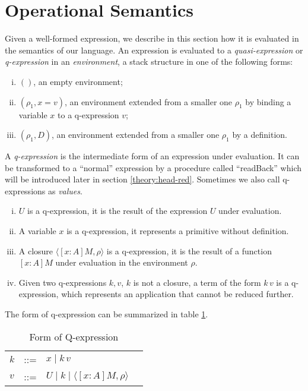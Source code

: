 \section{Operational Semantics}\label{theory:semantic}
Given a well-formed expression, we describe in this section how it is evaluated in the semantics of our language. An expression is evaluated to a \emph{quasi-expression} or \emph{q-expression} in an \emph{environment}, a stack structure in one of the following forms: 
\begin{definition}[Environment]
  \leavevmode \vspace{-\baselineskip}
  \begin{enumerate}[(i)]
  \item $()$, an empty environment;
  \item $(\rho_1, x = v)$, an environment extended from a smaller one $\rho_1$ by binding a variable $x$ to a q-expression $v$;
  \item $(\rho_1, D)$, an environment extended from a smaller one $\rho_1$ by a definition.
  \end{enumerate}
\end{definition}

A \emph{q-expression} is the intermediate form of an expression under evaluation. It can be transformed to a ``normal'' expression by a procedure called ``readBack'' which will be introduced later in section \ref{theory:head-red}. Sometimes we also call q-expressions as \emph{values}.
\begin{definition}[q-expression]\label{theory:def:q-exp}
  \leavevmode \vspace{-\baselineskip}
  \begin{enumerate}[(i)]
    \item $U$ is a q-expression, it is the result of the expression $U$ under evaluation.
    \item A variable $x$ is a q-expression, it represents a primitive without definition. 
    \item A closure $\langle [x : A] M, \rho \rangle$ is a q-expression, it is the result of a function $[x:A]M$ under evaluation in the environment $\rho$.
    \item Given two q-expressions $k,v$, $k$ is not a closure, a term of the form $k\,v$ is a q-expression, which represents an application that cannot be reduced further.
  \end{enumerate}
\end{definition}

The form of q-expression can be summarized in table \ref{theory:tab:q-expression}.
\begin{table}[h]
  \centering
  \begin{tabular}{l l l l}
    $k$ & ::= & $x \mid k\,v$ \\
    $v$ & ::= & $U \mid k \mid \langle [x:A]M,\rho \rangle$
  \end{tabular}
  \caption{Form of Q-expression}
  \label{theory:tab:q-expression}
\end{table}

